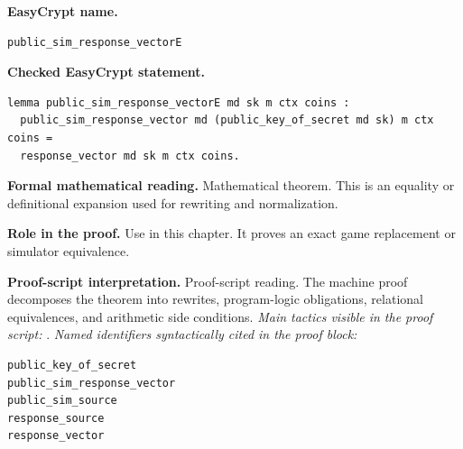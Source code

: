 \begin{formaltheorem}
\noindent\textbf{EasyCrypt name.}
\begin{lstlisting}[language=EasyCrypt,basicstyle=\ttfamily\scriptsize]
public_sim_response_vectorE
\end{lstlisting}
\noindent\textbf{Checked EasyCrypt statement.}
\begin{lstlisting}[language=EasyCrypt,basicstyle=\ttfamily\scriptsize]
lemma public_sim_response_vectorE md sk m ctx coins :
  public_sim_response_vector md (public_key_of_secret md sk) m ctx coins =
  response_vector md sk m ctx coins.
\end{lstlisting}
\noindent\textbf{Formal mathematical reading.}
Mathematical theorem. This is an equality or definitional expansion used for rewriting and normalization.

\noindent\textbf{Role in the proof.}
Use in this chapter. It proves an exact game replacement or simulator equivalence.

\noindent\textbf{Proof-script interpretation.}
Proof-script reading. The machine proof decomposes the theorem into rewrites, program-logic obligations, relational equivalences, and arithmetic side conditions.
\emph{Main tactics visible in the proof script:} .
\emph{Named identifiers syntactically cited in the proof block:}
\begin{lstlisting}[language=EasyCrypt,basicstyle=\ttfamily\scriptsize]
public_key_of_secret
public_sim_response_vector
public_sim_source
response_source
response_vector
\end{lstlisting}

\end{formaltheorem}

